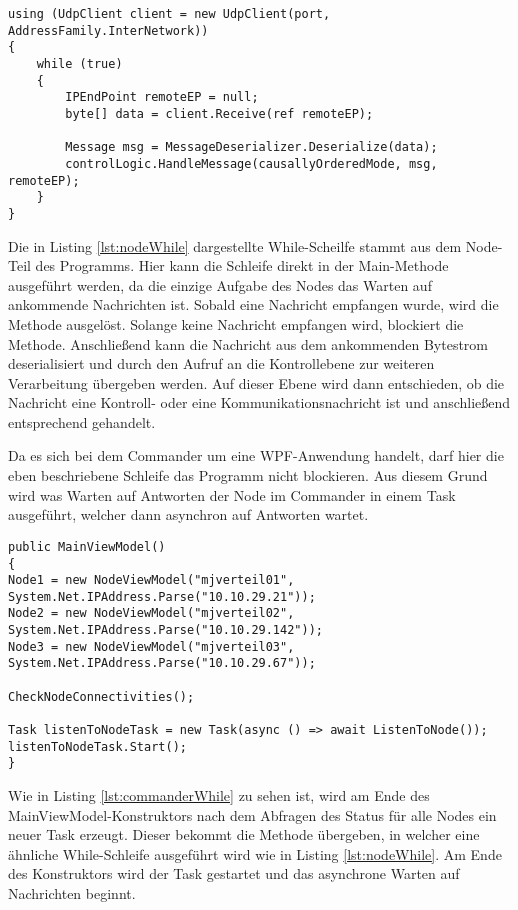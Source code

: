 \begin{lstlisting}[label=lst:nodeWhile,
language=sharpc,
float=ht,
firstnumber=1,
caption=While-Scheife für das Warten auf neue Nachrichten. Auszug aus dem Node.]
using (UdpClient client = new UdpClient(port, AddressFamily.InterNetwork))
{
	while (true)
	{
		IPEndPoint remoteEP = null;
		byte[] data = client.Receive(ref remoteEP);

		Message msg = MessageDeserializer.Deserialize(data);
		controlLogic.HandleMessage(causallyOrderedMode, msg, remoteEP);
	}
}
\end{lstlisting}

Die in Listing \ref{lst:nodeWhile} dargestellte While-Scheilfe stammt aus dem Node-Teil des Programms. Hier kann die Schleife direkt in der Main-Methode ausgeführt werden, da die einzige Aufgabe des Nodes das Warten auf ankommende Nachrichten ist. Sobald eine Nachricht empfangen wurde, wird die Methode  ausgelöst. Solange keine Nachricht empfangen wird, blockiert die Methode. Anschließend kann die Nachricht aus dem ankommenden Bytestrom deserialisiert und durch den Aufruf  an die Kontrollebene zur weiteren Verarbeitung übergeben werden. Auf dieser Ebene wird dann entschieden, ob die Nachricht eine Kontroll- oder eine Kommunikationsnachricht ist und anschließend entsprechend gehandelt.

Da es sich bei dem Commander um eine WPF-Anwendung handelt, darf hier die eben beschriebene Schleife das Programm nicht blockieren. Aus diesem Grund wird was Warten auf Antworten der Node im Commander in einem Task ausgeführt, welcher dann asynchron auf Antworten wartet.

\begin{lstlisting}[label=lst:commanderWhile,
language=sharpc,
float=ht,
firstnumber=1,
caption=Starten eines neuen Tasks um asynchron auf eventuelle Rückantworten der Nodes zu warten.]
public MainViewModel()
{
Node1 = new NodeViewModel("mjverteil01", System.Net.IPAddress.Parse("10.10.29.21"));
Node2 = new NodeViewModel("mjverteil02", System.Net.IPAddress.Parse("10.10.29.142"));
Node3 = new NodeViewModel("mjverteil03", System.Net.IPAddress.Parse("10.10.29.67"));

CheckNodeConnectivities();

Task listenToNodeTask = new Task(async () => await ListenToNode());
listenToNodeTask.Start();
}
\end{lstlisting}

Wie in Listing \ref{lst:commanderWhile} zu sehen ist, wird am Ende des MainViewModel-Konstruktors nach dem Abfragen des Status für alle Nodes ein neuer Task  erzeugt. Dieser bekommt die Methode  übergeben, in welcher eine ähnliche While-Schleife ausgeführt wird wie in Listing \ref{lst:nodeWhile}. Am Ende des Konstruktors wird der Task gestartet und das asynchrone Warten auf Nachrichten beginnt.

